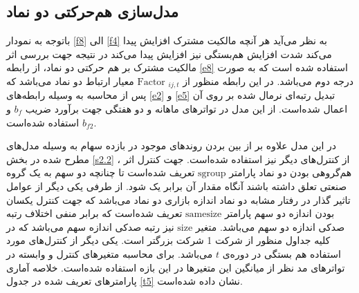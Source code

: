 \documentclass[12pt]{article}
\begin{document}
  \FloatBarrier
  
  
  \subsection{مدل‌سازی هم‌حرکتی دو نماد}
 باتوجه به  نمودار  
 \ref{f8}
   الی 
   \ref{f4}
   به نظر می‌آید هر آنچه مالکیت مشترک افزایش پیدا می‌کند شدت افزایش هم‌بستگی نیز افزایش پیدا می‌کند در نتیجه جهت بررسی اثر مالکیت مشترک بر هم حرکتی دو نماد، از رابطه 
  \ref{e8}
استفاده شده است که به صورت درجه دوم می‌باشد. در این رابطه منظور از
   $ \text{Factor }_{ij,t} $
    معیار ارتباط دو نماد می‌باشد که پس از محاسبه به وسیله  رابطه‌های 
   \ref{e2}
   و
   \ref{e5}
   تبدیل رتبه‌ای نرمال شده بر روی آن اعمال شده‌است. از این مدل در تواتر‌های ماهانه و دو هفتگی جهت برآورد ضریب $ b_f $ 
   و
   $ b_{f2} $ 
   استفاده شده‌است.
   
  
  
در این مدل  علاوه بر از بین بردن روند‌های موجود در بازده سهام به وسیله مدل‌های مطرح شده در بخش 
\ref{s2.2}
، از کنترل‌های دیگر نیز استفاده شده‌است.  
جهت کنترل اثر هم‌گروهی بودن دو نماد پارامتر  
  $ \text{sgroup} $
  تعریف شده‌است  تا چنانچه دو سهم به یک گروه صنعتی تعلق داشته باشند آنگاه مقدار آن برابر یک شود. از طرفی یکی دیگر از عوامل تاثیر گذار در رفتار مشابه دو نماد اندازه بازاری دو نماد می‌باشد که جهت کنترل یکسان بودن اندازه دو سهم پارامتر
  $ \text{samesize} $
 تعریف شده‌است که برابر منفی اختلاف رتبه صدکی اندازه دو سهم می‌باشد. متغیر 
  $ \text{size} $ 
  نیز رتبه صدکی اندازه سهم می‌باشد که در کلیه جداول منظور از 
  شرکت 1 شرکت بزرگتر است. یکی دیگر از کنترل‌های مورد استفاده هم بستگی در دوره‌ی $ t $ می‌باشد. برای محاسبه متغیر‌های کنترل و وابسته در تواتر‌های مد نظر از میانگین این متغیر‌ها در این بازه استفاده شده‌است.
  خلاصه آماری پارامتر‌های تعریف شده در جدول 
  \ref{t5}
  نشان داده شده‌است.
  
  
  
  
  
  
  
\end{document}
